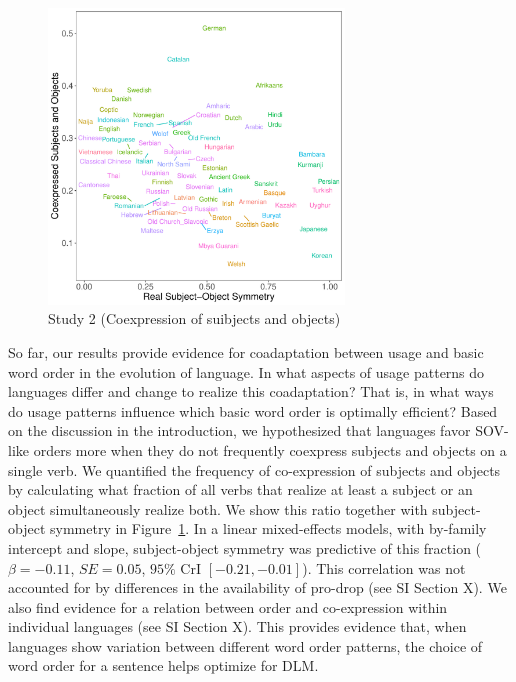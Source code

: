 \documentclass[11pt,a4paper]{article}
\begin{document}
\begin{figure}
    \centering
    \includegraphics[width=0.7\textwidth]{../analysis/figures/objects-order-pureud-byVerb_FORMAT.pdf}
    \caption{Study 2 (Coexpression of suibjects and objects)}
    \label{fig:study2}
\end{figure}

So far, our results provide evidence for coadaptation between usage and basic word order in the evolution of language.
In what aspects of usage patterns do languages differ and change to realize this coadaptation?
That is, in what ways do usage patterns influence which basic word order is optimally efficient?
Based on the discussion in the introduction, we hypothesized that languages favor SOV-like orders more when they do not frequently coexpress subjects and objects on a single verb.
We quantified the frequency of co-expression of subjects and objects by calculating what fraction of all verbs that realize at least a subject or an object simultaneously realize both.
We show this ratio together with subject-object symmetry in Figure~\ref{fig:study2}.
In a linear mixed-effects models, with by-family intercept and slope, subject-object symmetry was predictive of this fraction ($\beta=-0.11$, $SE=0.05$, $95\%$ CrI $[-0.21, -0.01]$).
This correlation was not accounted for by differences in the availability of pro-drop (see SI Section X).
We also find evidence for a relation between order and co-expression within individual languages (see SI Section X). %
This provides evidence that, when languages show variation between different word order patterns, the choice of word order for a sentence helps optimize for DLM.
\end{document}
